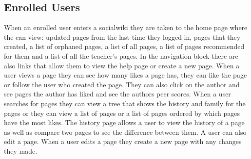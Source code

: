 \documentclass[letterpaper,twoside,11pt]{article}
\begin{document}
	\subsection{Enrolled Users}
	When an enrolled user enters a socialwiki they are taken to the home page where the can view: updated pages from the last time they logged in, pages that they created, a list of orphaned pages, a list of all pages, a list of pages recommended for them and a list of all the teacher's pages. In the navigation block there are also links that allow them to view the help page or create a new page.
	When a user views a page they can see how many likes a page has, they can like the page or follow the user who created the page. They can also click on the author and see pages the author has liked and see the authors peer scores. 
	When a user searches for pages they can view a tree that shows the history and family for the pages or they can view a list of pages or a list of pages ordered by which pages have the most likes.
	The history page allows a user to view the history of a page as well as compare two pages to see the difference between them. 
	A user can also edit a page. When a user edits a page they create a new page with any changes they made. 
	
\end{document}
